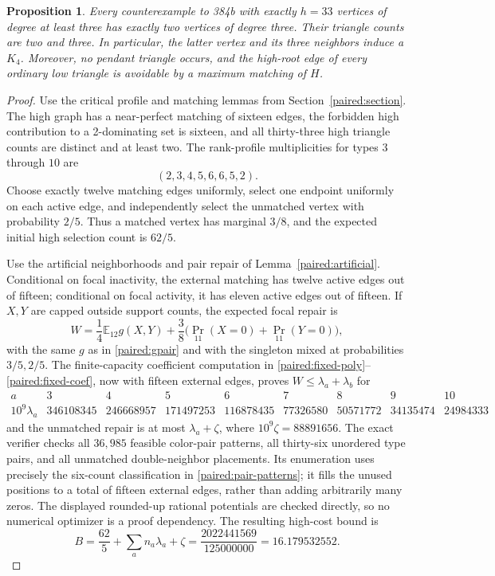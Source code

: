 \documentclass[11pt,a4paper]{article}
\newtheorem{proposition}[theorem]{Proposition}
\theoremstyle{definition}\newtheorem{definition}[theorem]{Definition}
\theoremstyle{remark}\newtheorem{remark}[theorem]{Remark}
\begin{document}
\begin{proposition}\label{r12:384h33-prop}
Every counterexample to 384b with exactly $h=33$ vertices of degree at
least three has exactly two vertices of degree three. Their triangle
counts are two and three. In particular, the latter vertex and its three
neighbors induce a $K_4$. Moreover, no pendant triangle occurs, and the
high-root edge of every ordinary low triangle is avoidable by a
maximum matching of $H$.
\end{proposition}
\begin{proof}
Use the critical profile and matching lemmas from
Section~\ref{paired:section}. The high graph has a near-perfect matching
of sixteen edges, the forbidden high contribution to a 2-dominating
set is sixteen, and all thirty-three high triangle counts are distinct
and at least two. The rank-profile multiplicities for types $3$ through
$10$ are
\[
 (2,3,4,5,6,6,5,2).
\]
Choose exactly twelve matching edges uniformly, select one endpoint
uniformly on each active edge, and independently select the unmatched
vertex with probability $2/5$. Thus a matched vertex has marginal
$3/8$, and the expected initial high selection count is $62/5$.

Use the artificial neighborhoods and pair repair of
Lemma~\ref{paired:artificial}. Conditional on focal inactivity, the
external matching has twelve active edges out of fifteen; conditional
on focal activity, it has eleven active edges out of fifteen. If $X,Y$
are capped outside support counts, the expected focal repair is
\[
 W=\frac14\mathbb E_{12}g(X,Y)
     +\frac38\bigl(\Pr_{11}(X=0)+\Pr_{11}(Y=0)\bigr),
\]
with the same $g$ as in \eqref{paired:gpair} and with the singleton
mixed at probabilities $3/5,2/5$.
The finite-capacity coefficient computation in
\eqref{paired:fixed-poly}--\eqref{paired:fixed-coef}, now with fifteen
external edges, proves $W\le\lambda_a+\lambda_b$ for
\begingroup\setlength{\arraycolsep}{2pt}
\[
\begin{array}{c|rrrrrrrr}
a&3&4&5&6&7&8&9&10\\\hline
10^9\lambda_a&346108345&246668957&171497253&116878435&
77326580&50571772&34135474&24984333
\end{array}
\]
\endgroup
and the unmatched repair is at most $\lambda_a+\zeta$, where
$10^9\zeta=88891656$. The exact verifier checks all $36,985$ feasible
color-pair patterns, all thirty-six unordered type pairs, and all
unmatched double-neighbor placements. Its enumeration uses precisely
the six-count classification in \eqref{paired:pair-patterns}; it fills
the unused positions to a total of fifteen external edges, rather
than adding arbitrarily many zeros. The displayed rounded-up rational
potentials are checked directly, so no numerical optimizer is a proof
dependency. The resulting high-cost bound is
\[
 B=\frac{62}{5}+\sum_a n_a\lambda_a+\zeta
   =\frac{2022441569}{125000000}=16.179532552.
\]


\end{proof}
\end{document}
